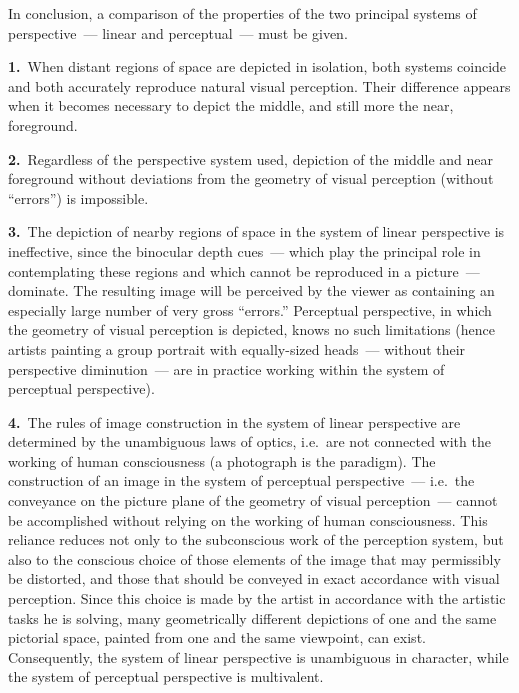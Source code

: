 In conclusion, a comparison of the properties of the two principal systems of
perspective~--- linear and perceptual~--- must be given.

\medskip
\noindent\textbf{1.}~When distant regions of space are depicted in isolation, both
systems coincide and both accurately reproduce natural visual perception.  Their
difference appears when it becomes necessary to depict the middle, and still more the
near, foreground.

\medskip
\noindent\textbf{2.}~Regardless of the perspective system used, depiction of the middle
and near foreground without deviations from the geometry of visual perception (without
``errors'') is impossible.

\medskip
\noindent\textbf{3.}~The depiction of nearby regions of space in the system of linear
perspective is ineffective, since the binocular depth cues~--- which play the principal
role in contemplating these regions and which cannot be reproduced in a picture~---
dominate.  The resulting image will be perceived by the viewer as containing an
especially large number of very gross ``errors.''  Perceptual perspective, in which the
geometry of visual perception is depicted, knows no such limitations (hence artists
painting a group portrait with equally-sized heads~--- without their perspective
diminution~--- are in practice working within the system of perceptual perspective).


\medskip
\noindent\textbf{4.}~The rules of image construction in the system of linear perspective
are determined by the unambiguous laws of optics, i.e.\ are not connected with the
working of human consciousness (a photograph is the paradigm).  The construction of
an image in the system of perceptual perspective~--- i.e.\ the conveyance on the picture
plane of the geometry of visual perception~--- cannot be accomplished without relying
on the working of human consciousness.  This reliance reduces not only to the
subconscious work of the perception system, but also to the conscious choice of those
elements of the image that may permissibly be distorted, and those that should be
conveyed in exact accordance with visual perception.  Since this choice is made by the
artist in accordance with the artistic tasks he is solving, many geometrically different
depictions of one and the same pictorial space, painted from one and the same viewpoint,
can exist.  Consequently, the system of linear perspective is unambiguous in character,
while the system of perceptual perspective is multivalent.

